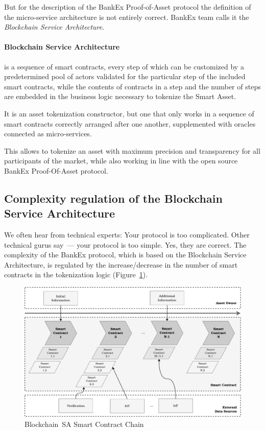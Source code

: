 \documentclass{article}
\begin{document}
\begin{multicols}{2}
But for the description of the BankEx Proof-of-Asset protocol the definition of the micro-service architecture is not entirely correct. BankEx team calls it the \textit{Blockchain Service Architecture}.

\paragraph*{Blockchain Service Architecture} is a sequence of smart contracts, every step of which can be customized by a predetermined pool of actors validated for the particular step of the included smart contracts, while the contents of contracts in a step and the number of steps are embedded in the business logic necessary to tokenize the Smart Asset.

It is an asset tokenization constructor, but one that only works in a sequence of smart contracts correctly arranged after one another, supplemented with oracles connected as micro-services. 

This allows to tokenize an asset with maximum precision and transparency for all participants of the market, while also working in line with the open source BankEx Proof-Of-Asset protocol. 

\subsection{Complexity regulation of the Blockchain Service Architecture}

We often hear from technical experts: Your protocol is too complicated. Other technical gurus say~--- your protocol is too simple. Yes, they are correct. The complexity of the BankEx protocol, which is based on the Blockchain Service Architecture, is regulated by the increase/decrease in the number of smart contracts in the tokenization logic (Figure~\ref{fig:smart-asset-contract-chain}).

\begin{figure}
  \centering
  \includegraphics[width=\textwidth]{smart-asset-contract-chain.pdf}
  \caption{Blockchain~SA Smart Contract Chain}
  \label{fig:smart-asset-contract-chain}
\end{figure}


\end{multicols}
\end{document}
